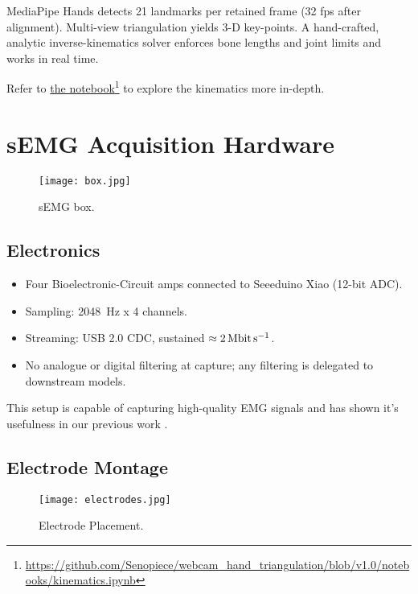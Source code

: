 MediaPipe Hands detects 21 landmarks per retained frame (32 fps after alignment). Multi-view triangulation yields 3-D key-points. A hand-crafted, analytic inverse-kinematics solver enforces bone lengths and joint limits and works in real time.

Refer to \href{https://github.com/Senopiece/webcam_hand_triangulation/blob/v1.0/notebooks/kinematics.ipynb}{the notebook}\footnote{\url{https://github.com/Senopiece/webcam_hand_triangulation/blob/v1.0/notebooks/kinematics.ipynb}} to explore the kinematics more in-depth. 

\section{sEMG Acquisition Hardware}

\begin{figure}[H]
    \centering
    \texttt{[image: box.jpg]}
    \caption{sEMG box.}
    \label{fig:box}
\end{figure}

\subsection{Electronics}
\begin{itemize}
  \item Four Bioelectronic-Circuit amps connected to Seeeduino Xiao (12-bit ADC).
  \item Sampling: \SI{2048}{Hz} x 4 channels.
  \item Streaming: USB 2.0 CDC, sustained $\approx \SI{2}{\mega\bit\per\second}$.
  \item No analogue or digital filtering at capture; any filtering is delegated
        to downstream models.
\end{itemize}

This setup is capable of capturing high-quality EMG signals and has shown it's usefulness in our previous work \cite{nasybullin2024methodology}.

\subsection{Electrode Montage}

\begin{figure}[H]
    \centering
    \texttt{[image: electrodes.jpg]}
    \caption{Electrode Placement.}
    \label{fig:electrodes}
\end{figure}

